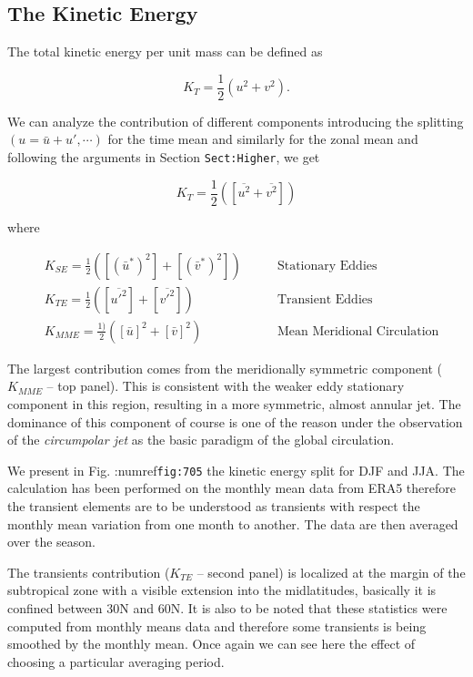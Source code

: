 \subsection{The Kinetic Energy}\label{the-kinetic-energy}

The total kinetic energy per unit mass can be defined as

\[K_T = \frac{1} {2} ( u^2 + v^2).\]

We can analyze the contribution of different components introducing the
splitting \((u = \bar{u}+ u', \cdots )\) for the time mean and similarly
for the zonal mean and following the arguments in Section
\texttt{Sect:Higher}, we get

\[K_T = \frac{1} {2}( [\overline{u^2} + \overline{v^2}])\]

where

\[\begin{aligned}
&K_{SE} =\frac{1} {2}( [(\bar{u}^*)^2]  + [(\bar{v}^*)^2]) \qquad & \text{Stationary Eddies}\\
& K_{TE} = \frac{1} {2}( [\overline{u'^2}]  +[\overline{v'^2}] ) \qquad & \text{Transient Eddies}\\
& K_{MME} = \frac{1)} {2}([\bar{u}]^2 + [\bar{v}]^2) \qquad & \text{Mean Meridional Circulation}
\end{aligned}\]

The largest contribution comes from the meridionally symmetric component
(\(K_{MME}\) -- top panel). This is consistent with the weaker eddy
stationary component in this region, resulting in a more symmetric,
almost annular jet. The dominance of this component of course is one of
the reason under the observation of the \emph{circumpolar jet} as the
basic paradigm of the global circulation.

We present in Fig. :numref\texttt{fig:705} the kinetic energy split for
DJF and JJA. The calculation has been performed on the monthly mean data
from ERA5 therefore the transient elements are to be understood as
transients with respect the monthly mean variation from one month to
another. The data are then averaged over the season.

The transients contribution (\(K_{TE}\) -- second panel) is localized at
the margin of the subtropical zone with a visible extension into the
midlatitudes, basically it is confined between 30N and 60N. It is also
to be noted that these statistics were computed from monthly means data
and therefore some transients is being smoothed by the monthly mean.
Once again we can see here the effect of choosing a particular averaging
period.

